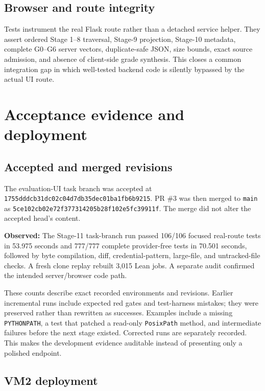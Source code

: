 \documentclass[11pt]{article}
\newcommand{\code}[1]{\texttt{#1}}
\newcommand{\observed}{\textbf{Observed: }}
\begin{document}
\subsection{Browser and route integrity}

Tests instrument the real Flask route rather than a detached service helper.
They assert ordered Stage 1--8 traversal, Stage-9 projection, Stage-10 metadata,
complete G0--G6 server vectors, duplicate-safe JSON, size bounds, exact source
admission, and absence of client-side grade synthesis.  This closes a common
integration gap in which well-tested backend code is silently bypassed by the
actual UI route.

\section{Acceptance evidence and deployment}

\subsection{Accepted and merged revisions}

The evaluation-UI task branch was accepted at
\code{1755dddcb31dc02c04d7db35dec01ba1fb6b9215}.  PR \#3 was then merged to
\code{main} as
\code{5ce102cb02e72f377314205b28f102e5fc39911f}.  The merge did not alter the
accepted head's content.

\observed The Stage-11 task-branch run passed 106/106 focused real-route tests
in 53.975 seconds and 777/777 complete provider-free tests in 70.501 seconds,
followed by byte compilation, diff, credential-pattern, large-file, and
untracked-file checks.  A fresh clone replay rebuilt 3,015 Lean jobs.  A
separate audit confirmed the intended server/browser code path.

These counts describe exact recorded environments and revisions.  Earlier
incremental runs include expected red gates and test-harness mistakes; they
were preserved rather than rewritten as successes.  Examples include a
missing \code{PYTHONPATH}, a test that patched a read-only \code{PosixPath}
method, and intermediate failures before the next stage existed.  Corrected
runs are separately recorded.  This makes the development evidence auditable
instead of presenting only a polished endpoint.

\subsection{VM2 deployment}
\end{document}
